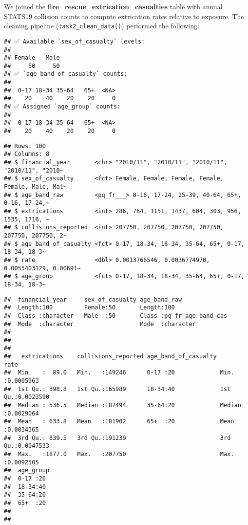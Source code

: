\documentclass[
]{article}
\begin{document}
We joined the \textbf{fire\_rescue\_extrication\_casualties} table with
annual STATS19 collision counts to compute extrication rates relative to
exposure. The cleaning pipeline (\texttt{task2\_clean\_data()})
performed the following:

\begin{verbatim}
## ✅ Available `sex_of_casualty` levels:
## 
## Female   Male 
##     50     50 
## ✅ `age_band_of_casualty` counts:
## 
##  0-17 18-34 35-64   65+  <NA> 
##    20    40    20    20     0 
## ✅ Assigned `age_group` counts:
## 
##  0-17 18-34 35-64   65+  <NA> 
##    20    40    20    20     0
\end{verbatim}

\begin{verbatim}
## Rows: 100
## Columns: 8
## $ financial_year       <chr> "2010/11", "2010/11", "2010/11", "2010/11", "2010~
## $ sex_of_casualty      <fct> Female, Female, Female, Female, Female, Male, Mal~
## $ age_band_raw         <pq_fr___> 0-16, 17-24, 25-39, 40-64, 65+, 0-16, 17-24,~
## $ extrications         <int> 286, 764, 1151, 1437, 604, 303, 956, 1535, 1716, ~
## $ collisions_reported  <int> 207750, 207750, 207750, 207750, 207750, 207750, 2~
## $ age_band_of_casualty <fct> 0-17, 18-34, 18-34, 35-64, 65+, 0-17, 18-34, 18-3~
## $ rate                 <dbl> 0.0013766546, 0.0036774970, 0.0055403129, 0.00691~
## $ age_group            <fct> 0-17, 18-34, 18-34, 35-64, 65+, 0-17, 18-34, 18-3~
\end{verbatim}

\begin{verbatim}
##  financial_year     sex_of_casualty age_band_raw               
##  Length:100         Female:50       Length:100                 
##  Class :character   Male  :50       Class :pq_fr_age_band_cas  
##  Mode  :character                   Mode  :character           
##                                                                
##                                                                
##                                                                
##   extrications    collisions_reported age_band_of_casualty      rate          
##  Min.   :  89.0   Min.   :149246      0-17 :20             Min.   :0.0005963  
##  1st Qu.: 398.8   1st Qu.:165989      18-34:40             1st Qu.:0.0023590  
##  Median : 536.5   Median :187494      35-64:20             Median :0.0029064  
##  Mean   : 633.8   Mean   :181902      65+  :20             Mean   :0.0034365  
##  3rd Qu.: 839.5   3rd Qu.:191239                           3rd Qu.:0.0047533  
##  Max.   :1877.0   Max.   :207750                           Max.   :0.0092505  
##  age_group 
##  0-17 :20  
##  18-34:40  
##  35-64:20  
##  65+  :20  
##            
## 
\end{verbatim}
\end{document}
